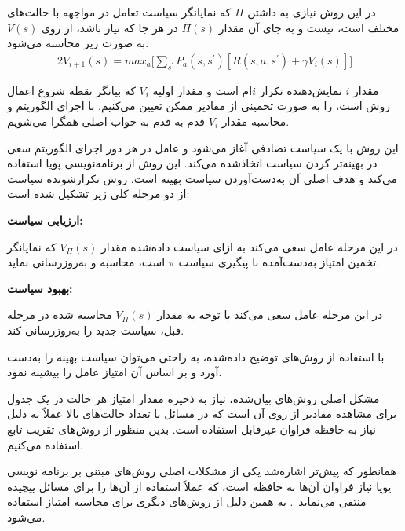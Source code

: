
در این روش نیازی به داشتن $\Pi$ که نمایانگر سیاست تعامل در مواجهه با حالت‌های مختلف است، نیست و به جای آن مقدار $\Pi(s)$ در هر جا که نیاز باشد، از روی $V(s)$ به صورت زیر محاسبه می‌شود.
\begin{alignat}{2}
	V_{i+1}(s) = max_a \bigg[ \sum\limits_{s^{'}} P_a(s,s^{'})[R(s,a,s^{'})+\gamma V_i(s)] \bigg]
	\label{103}  
\end{alignat}  

مقدار $i$ نمایش‌دهنده تکرار $i$ام است و مقدار اولیه $V_i$ که بیانگر نقطه شروع اعمال روش است، را به صورت تخمینی از مقادیر ممکن تعیین می‌کنیم. با اجرای الگوریتم و محاسبه مقدار $V_i$ قدم به قدم به جواب اصلی همگرا می‌شویم. 



این روش با یک سیاست تصادفی آغاز می‌شود و عامل در هر دور اجرای الگوریتم سعی در بهینه‌تر کردن سیاست اتخاذ‌شده می‌کند. این روش از برنامه‌نویسی پویا  استفاده می‌کند و هدف اصلی آن به‌دست‌آوردن سیاست بهینه است. روش تکرارشونده سیاست از دو مرحله کلی زیر تشکیل شده است:




 \textbf{ارزیابی سیاست:} 

 در این مرحله عامل سعی می‌کند به ازای سیاست داده‌شده مقدار $V_\Pi(s)$ که نمایانگر تخمین امتیاز به‌دست‌آمده با پیگیری سیاست $\pi$ است، محاسبه و به‌روز‌رسانی نماید.


 \textbf{بهبود سیاست:} 

در این مرحله عامل سعی می‌کند با توجه به مقدار $V_\Pi(s)$ محاسبه شده در مرحله قبل، سیاست جدید را به‌روزرسانی کند.


با استفاده از روش‌های توضیح داده‌شده، به راحتی می‌توان سیاست بهینه را به‌دست آورد و بر اساس آن امتیاز عامل را بیشینه نمود. 

مشکل اصلی روش‌های بیان‌شده، نیاز به ذخیره مقدار امتیاز هر حالت در یک جدول برای مشاهده مقادیر از روی آن است که در مسائل با تعداد حالت‌های بالا عملاً به دلیل نیاز به حافظه فراوان غیرقابل استفاده است. بدین منظور از روش‌های تقریب تابع استفاده می‌کنیم.



همانطور که پیش‌تر اشاره‌شد یکی از مشکلات اصلی روش‌های مبتنی بر برنامه نویسی پویا نیاز فراوان آن‌ها به حافظه است، که عملاً استفاده از آن‌ها را برای مسائل پیچیده منتفی می‌نماید~\cite{sutton2018reinforcement}. به همین دلیل از روش‌های دیگری برای محاسبه امتیاز استفاده می‌شود. 

